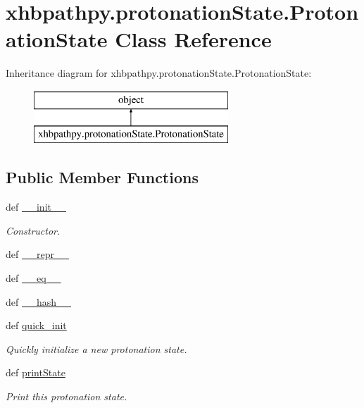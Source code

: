 \hypertarget{classxhbpathpy_1_1protonation_state_1_1_protonation_state}{\section{xhbpathpy.\-protonation\-State.\-Protonation\-State Class Reference}
\label{classxhbpathpy_1_1protonation_state_1_1_protonation_state}
}
Inheritance diagram for xhbpathpy.\-protonation\-State.\-Protonation\-State\-:\begin{figure}[H]
\begin{center}
\leavevmode
\includegraphics[height=2.000000cm]{classxhbpathpy_1_1protonation_state_1_1_protonation_state}
\end{center}
\end{figure}
\subsection*{Public Member Functions}
\begin{DoxyCompactItemize}
\item 
def \hyperlink{classxhbpathpy_1_1protonation_state_1_1_protonation_state_a97fa886feefb45c53f16de89c987ab65}{\-\_\-\-\_\-init\-\_\-\-\_\-}
\begin{DoxyCompactList}\small\item\em Constructor. \end{DoxyCompactList}\item 
def \hyperlink{classxhbpathpy_1_1protonation_state_1_1_protonation_state_a7318ae03f33e71a7a152ad302cc2d3e6}{\-\_\-\-\_\-repr\-\_\-\-\_\-}
\item 
def \hyperlink{classxhbpathpy_1_1protonation_state_1_1_protonation_state_a2d83b7c7c8bb45be4242ebaf8c4e976d}{\-\_\-\-\_\-eq\-\_\-\-\_\-}
\item 
def \hyperlink{classxhbpathpy_1_1protonation_state_1_1_protonation_state_a4d735a3c5252f4ce4bebf4f7e2b82b54}{\-\_\-\-\_\-hash\-\_\-\-\_\-}
\item 
def \hyperlink{classxhbpathpy_1_1protonation_state_1_1_protonation_state_a06d0bb021a69a624e60e4127f061ddef}{quick\-\_\-init}
\begin{DoxyCompactList}\small\item\em Quickly initialize a new protonation state. \end{DoxyCompactList}\item 
def \hyperlink{classxhbpathpy_1_1protonation_state_1_1_protonation_state_aff312c5d2ec353dc963fe1ff3bae9d61}{print\-State}
\begin{DoxyCompactList}\small\item\em Print this protonation state. \end{DoxyCompactList}\end{DoxyCompactItemize}
